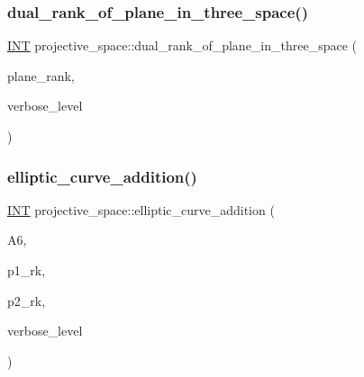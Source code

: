 \subsubsection{\texorpdfstring{dual\+\_\+rank\+\_\+of\+\_\+plane\+\_\+in\+\_\+three\+\_\+space()}{dual\_rank\_of\_plane\_in\_three\_space()}}
{\footnotesize\ttfamily \mbox{\hyperlink{galois_8h_a09fddde158a3a20bd2dcadb609de11dc}{I\+NT}} projective\+\_\+space\+::dual\+\_\+rank\+\_\+of\+\_\+plane\+\_\+in\+\_\+three\+\_\+space (\begin{DoxyParamCaption}\item[{\mbox{\hyperlink{galois_8h_a09fddde158a3a20bd2dcadb609de11dc}{I\+NT}}}]{plane\+\_\+rank,  }\item[{\mbox{\hyperlink{galois_8h_a09fddde158a3a20bd2dcadb609de11dc}{I\+NT}}}]{verbose\+\_\+level }\end{DoxyParamCaption})}

\mbox{\label{classprojective__space_a8467d469b4b77005ddb537766a0818a4}} 
\subsubsection{\texorpdfstring{elliptic\+\_\+curve\+\_\+addition()}{elliptic\_curve\_addition()}}
{\footnotesize\ttfamily \mbox{\hyperlink{galois_8h_a09fddde158a3a20bd2dcadb609de11dc}{I\+NT}} projective\+\_\+space\+::elliptic\+\_\+curve\+\_\+addition (\begin{DoxyParamCaption}\item[{\mbox{\hyperlink{galois_8h_a09fddde158a3a20bd2dcadb609de11dc}{I\+NT}} $\ast$}]{A6,  }\item[{\mbox{\hyperlink{galois_8h_a09fddde158a3a20bd2dcadb609de11dc}{I\+NT}}}]{p1\+\_\+rk,  }\item[{\mbox{\hyperlink{galois_8h_a09fddde158a3a20bd2dcadb609de11dc}{I\+NT}}}]{p2\+\_\+rk,  }\item[{\mbox{\hyperlink{galois_8h_a09fddde158a3a20bd2dcadb609de11dc}{I\+NT}}}]{verbose\+\_\+level }\end{DoxyParamCaption})}

\mbox{\label{classprojective__space_adb3ed668723c9509c7033fdf92a5831b}} 
